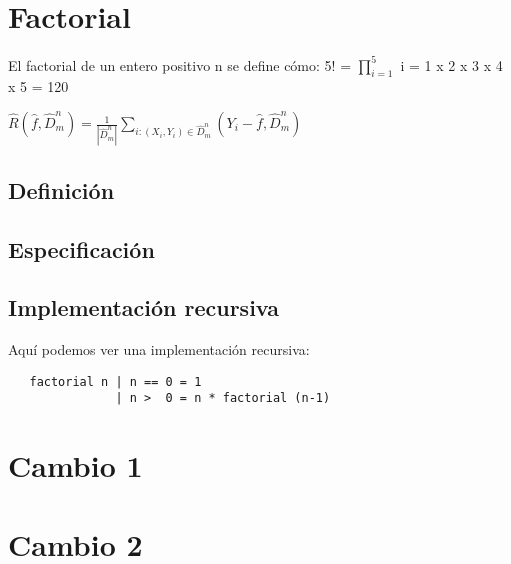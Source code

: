 \documentclass{article}
\begin{document}
\section{Factorial}


El factorial de un entero positivo n se define cómo: 5! = $\prod_{i=1}^{5}$ i = 1 x 2 x 3 x 4 x 5 = 120 


$\hat{R}(\hat{f}, \hat{D}_m^n ) = \frac{1}{|\hat{D}_m^n|} \sum_{i:(X_i, Y_i) \in \hat{D}_m^n }^{} (Y_i - \hat{f}, \hat{D}_m^n) $

\subsection{Definición}



\subsection{Especificación}


\subsection{Implementación recursiva}

Aquí podemos ver una implementación recursiva:

\begin{verbatim}
   factorial n | n == 0 = 1
               | n >  0 = n * factorial (n-1)
\end{verbatim}


\section{Cambio 1}
\section{Cambio 2}
\end{document}
